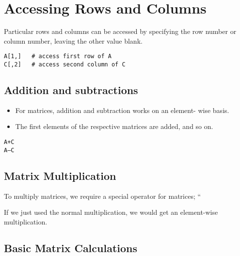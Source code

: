 \section{Accessing Rows and Columns}

Particular rows and columns can be accessed by specifying the row number or column number, leaving the other value blank.

\begin{framed}
\begin{verbatim}
A[1,]   # access first row of A
C[,2]   # access second column of C
\end{verbatim}
\end{framed}
\subsection{Addition and subtractions}

\begin{itemize}
\item For matrices, addition and subtraction works on an element- wise basis. 
\item The first elements of the respective matrices are added, and so on.
\end{itemize}


\begin{framed}
\begin{verbatim}
A+C                                             
A–C
\end{verbatim}
\end{framed}
\subsection{Matrix Multiplication}



To multiply matrices, we require a special operator for matrices; “%


If we just used the normal multiplication, we would get an element-wise multiplication.
\subsection{Basic Matrix Calculations}


